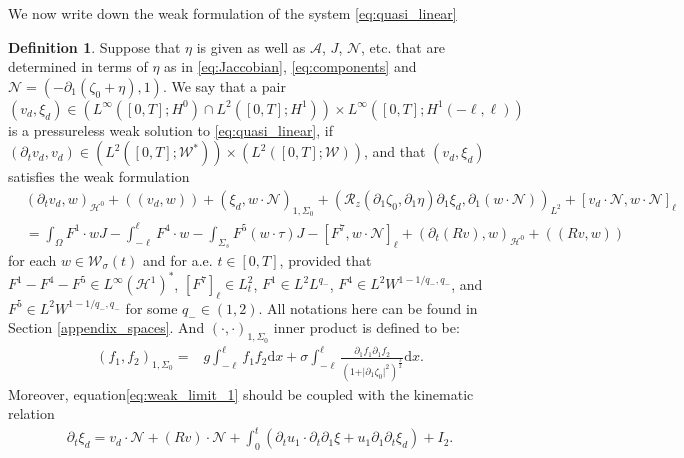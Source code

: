 \documentclass[letterpaper,reqno,10pt,twoside]{amsart}
\theoremstyle{definition}
\newtheorem{definition}{Definition}[section]
\theoremstyle{remark}
\def\p{\partial}
\def\Om{\Omega}
\begin{document}
	We now write down the weak formulation of the system \eqref{eq:quasi_linear}
	\begin{definition} \label{def:weak}  Suppose that $\eta$ is given as well as $\mathcal{A}$, $J$, $\mathcal{N}$, etc. that are determined in terms of $\eta$ as in \eqref{eq:Jaccobian}, \eqref{eq:components} and  $\mathcal{N} = (-\p_1(\zeta_0 + \eta), 1)$. We say that a pair $(v_{d}, \xi_{d}) \in \left(L^\infty([0,T]; H^0)\cap L^2([0,T]; H^1) \right) \times L^\infty([0,T];H^1(-\ell,\ell))$ is a pressureless weak solution to \eqref{eq:quasi_linear}, if $(\p_tv_{d},v_{d}) \in (L^2([0,T];\mathcal{W}^{*}))\times (L^2([0,T];\mathcal{W}))$, and that $(v_{d}, \xi_{d})$ satisfies the weak formulation
		\begin{equation}\label{eq:weak_limit_1}
			\begin{aligned}
				& (\p_tv_{d}, w)_{\mathcal{H}^0}+((v_{d},w))+ (\xi_{d}, w\cdot\mathcal{N})_{1,\Sigma_{0}}+(\mathcal{R}_{z}(\partial_{1}\zeta_{0},\partial_{1}\eta)\partial_{1}\xi_{d},\partial_{1}(w\cdot\mathcal{N}))_{L^{2}}+ [v_{d}\cdot\mathcal{N},w\cdot\mathcal{N}]_\ell
				\\ &=\int_\Om F^1\cdot wJ-\int_{-\ell}^{\ell} F^4\cdot w-\int_{\Sigma_s}F^5(w\cdot\tau)J -[F^7,w\cdot\mathcal{N}]_\ell+(\p_{t}(Rv),w)_{\mathcal{H}^{0}}+((Rv,w))
			\end{aligned}
		\end{equation}
		for each $w\in \mathcal{W}_{\sigma}(t)$ and for a.e. $t\in [0, T]$, provided that $F^1-F^4-F^5\in L^\infty (\mathcal{H}^1)^\ast$, $[F^7]_\ell\in L^2_t$, $F^1\in L^2L^{q_-}$, $F^4\in L^2W^{1-1/q_-,q_-}$, and $F^5\in L^2W^{1-1/q_-,q_-}$ for some $q_-\in (1, 2)$.  All notations here can be found in Section \ref{appendix_spaces}. And $(\cdot, \cdot)_{1,\Sigma_{0}}$ inner product is defined to be:
		\begin{align}
			(f_1,f_{2})_{1,\Sigma_{0}}=&g\int_{-\ell}^{\ell}f_{1}f_{2}\mathrm{d}x+\sigma\int_{-\ell}^{\ell}\frac{\partial_{1}f_{1}\partial_{1}f_{2}}{(1+\vert \partial_{1}\zeta_{0}\vert^{2})^{\frac{3}{2}}} \mathrm{d}x.\label{eq:product}
		\end{align}
		Moreover, equation\eqref{eq:weak_limit_1} should be coupled with the kinematic relation
		\begin{align} \label{eq:kinematic}
			\partial_{t}\xi_{d}=v_{d}\cdot \mathcal{N}+(Rv)\cdot \mathcal{N}+\int_{0}^{t}(\partial_{t}u_{1}\cdot\partial_{t}\p_{1}\xi+u_{1}\partial_{1}\partial_{t}\xi_{d})+I_{2}.
		\end{align}
	\end{definition}
\end{document}
